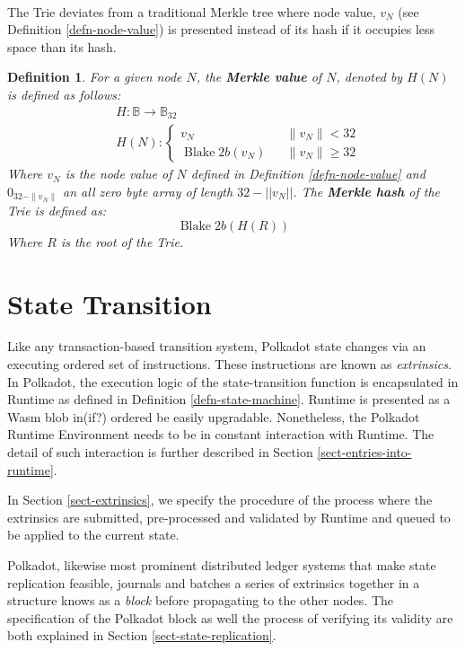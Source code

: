 \documentclass{book}
\newcommand{\tmem}[1]{{\em #1\/}}
\newcommand{\tmop}[1]{\ensuremath{\operatorname{#1}}}
\newcommand{\tmstrong}[1]{\textbf{#1}}
\newcommand{\tmtextbf}[1]{{\bfseries{#1}}}
\newcommand{\tmtextit}[1]{{\itshape{#1}}}
\newtheorem{definition}{Definition}
\providecommand{\tmem}[1]{\tmtextit{#1}}
\providecommand{\tmop}[1]{\ensuremath{\mathrm{#1}}}
\providecommand{\tmstrong}[1]{\tmtextbf{#1}}
\providecommand{\tmtextbf}[1]{\tmtextbf{#1}}
\providecommand{\tmtextit}[1]{\tmtextit{#1}}
\newtheorem{definition}{Definition}
\begin{document}
\

The Trie deviates from a traditional Merkle tree where node value, $v_N$ (see
Definition \ref{defn-node-value}) is presented instead of its hash if it
occupies less space than its hash.

\begin{definition}
  \label{defn-merkle-value}For a given node $N$, the {\tmstrong{Merkle value}}
  of $N$, denoted by $H (N)$ is defined as follows:
  \[ \begin{array}{ll}
       & H : \mathbb{B} \rightarrow \mathbb{B}_{32}\\
       & H (N) : \left\{ \begin{array}{lcl}
         v_N &  & \|v_N \|< 32\\
         \tmop{Blake} 2 b (v_N) &  & \|v_N \| \geqslant 32
       \end{array} \right.
     \end{array} \]
  Where $v_N$ is the node value of $N$ defined in Definition
  \ref{defn-node-value} and $0_{32 - \| v_N \|}$ an all zero byte array of
  length $32 - | | v_N | |$. The {\tmstrong{Merkle hash}} of the Trie is
  defined as:
  \[ \tmop{Blake} 2 b (H (R)) \]
  Where $R$ is the root of the Trie.
\end{definition}

\chapter{State Transition}\label{chap-state-transit}

Like any transaction-based transition system, Polkadot state changes via an
executing ordered set of instructions. These instructions are known as
{\tmem{extrinsics}}. In Polkadot, the execution logic of the state-transition
function is encapsulated in Runtime as defined in Definition
\ref{defn-state-machine}. Runtime is presented as a Wasm blob in(if?) ordered
be easily upgradable. Nonetheless, the Polkadot Runtime Environment needs to
be in constant interaction with Runtime. The detail of such interaction is
further described in Section \ref{sect-entries-into-runtime}.

In Section \ref{sect-extrinsics}, we specify the procedure of the process
where the extrinsics are submitted, pre-processed and validated by Runtime and
queued to be applied to the current state.

Polkadot, likewise most prominent distributed ledger systems that make state
replication feasible, journals and batches a series of extrinsics together in
a structure knows as a {\tmem{block}} before propagating to the other nodes.
The specification of the Polkadot block as well the process of verifying its
validity are both explained in Section \ref{sect-state-replication}.
\end{document}
